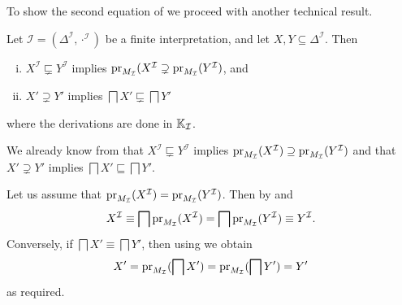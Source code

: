 To show the second equation of  we proceed with another technical result.

\begin{Proposition}
  \label{prop:non-equivalence-implies-non-equality-and-vv}
  Let $\mathcal{I} = (\Delta^{\mathcal{I}}, \cdot^{\mathcal{I}})$ be a finite
  interpretation, and let $X, Y \subseteq \Delta^{\mathcal{I}}$.  Then
  \begin{enumerate}[i. ]
  \item $X^{\mathcal{I}} \sqsubsetneq Y^{\mathcal{I}}$ implies
    $\operatorname{pr}_{M_{\mathcal{I}}}(X^{\mathcal{I}} \supsetneq
    \operatorname{pr}_{M_{\mathcal{I}}}(Y^{\mathcal{I}})$, and
  \item $X' \supsetneq Y'$ implies $\bigsqcap X' \sqsubsetneq \bigsqcap Y'$
  \end{enumerate}
  where the derivations are done in ${\mathbb{K}}_{\mathcal{I}}$.
\end{Proposition}
\begin{Proof}
  We already know from  that $X^{\mathcal{I}} \sqsubsetneq
  Y^{\mathcal{I}}$ implies $\operatorname{pr}_{M_{\mathcal{I}}}(X^{\mathcal{I}}) \supseteq
  \operatorname{pr}_{M_{\mathcal{I}}}(Y^{\mathcal{I}})$ and that $X' \supsetneq Y'$ implies $\bigsqcap
  X' \sqsubseteq \bigsqcap Y'$.

  Let us assume that $\operatorname{pr}_{M_{\mathcal{I}}}(X^{\mathcal{I}}) =
  \operatorname{pr}_{M_{\mathcal{I}}}(Y^{\mathcal{I}})$.  Then by
   and
  \begin{equation*}
    X^{\mathcal{I}} \equiv \bigsqcap \operatorname{pr}_{M_{\mathcal{I}}}(X^{\mathcal{I}}) = \bigsqcap
    \operatorname{pr}_{M_{\mathcal{I}}}(Y^{\mathcal{I}}) \equiv Y^{\mathcal{I}}.
  \end{equation*}
  Conversely, if $\bigsqcap X' \equiv \bigsqcap Y'$, then using
   we obtain
  \begin{equation*}
    X' = \operatorname{pr}_{M_{\mathcal{I}}}(\bigsqcap X') = \operatorname{pr}_{M_{\mathcal{I}}}(\bigsqcap Y') = Y'
  \end{equation*}
  as required.
\end{Proof}

